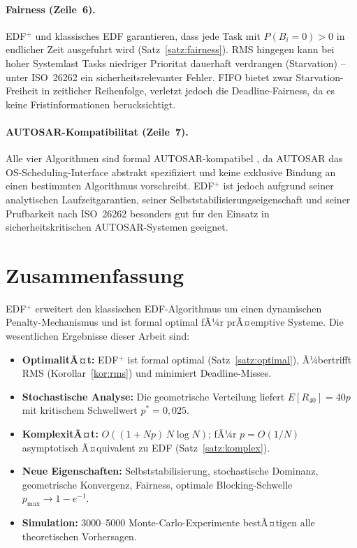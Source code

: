 ﻿\documentclass[a4paper,12pt]{article}
\theoremstyle{definition}
\begin{document}
	\paragraph{Fairness (Zeile~6).}
	EDF$^+$ und klassisches EDF garantieren, dass jede Task mit $P(B_i = 0) > 0$ in
	endlicher Zeit ausgefuhrt wird (Satz~\ref{satz:fairness}). RMS hingegen kann bei
	hoher Systemlast Tasks niedriger Prioritat dauerhaft verdrangen (Starvation) --
	unter ISO~26262 ein sicherheitsrelevanter Fehler. FIFO bietet zwar Starvation-Freiheit
	in zeitlicher Reihenfolge, verletzt jedoch die Deadline-Fairness, da es keine
	Fristinformationen berucksichtigt.

	\paragraph{AUTOSAR-Kompatibilitat (Zeile~7).}
	Alle vier Algorithmen sind formal AUTOSAR-kompatibel \cite{AUTOSAR2023}, da AUTOSAR das
	OS-Scheduling-Interface abstrakt spezifiziert und keine exklusive Bindung an einen
	bestimmten Algorithmus vorschreibt. EDF$^+$ ist jedoch aufgrund seiner analytischen
	Laufzeitgarantien, seiner Selbststabilisierungseigenschaft und seiner Prufbarkeit
	nach ISO~26262 besonders gut fur den Einsatz in sicherheitskritischen
	AUTOSAR-Systemen geeignet.

	\section{Zusammenfassung}
	
	EDF$^+$ erweitert den klassischen EDF-Algorithmus um einen dynamischen
	Penalty-Mecha\-nismus und ist formal optimal fÃ¼r prÃ¤emptive Systeme.
	Die wesentlichen Ergebnisse dieser Arbeit sind:
	
	\begin{itemize}
		\item \textbf{OptimalitÃ¤t:} EDF$^+$ ist formal optimal (Satz~\ref{satz:optimal}),
		Ã¼bertrifft RMS (Korollar~\ref{kor:rms}) und minimiert Deadline-Misses.
		\item \textbf{Stochastische Analyse:} Die geometrische Verteilung liefert
		$E[R_{40}] = 40p$ mit kritischem Schwellwert $p^* = 0{,}025$.
		\item \textbf{KomplexitÃ¤t:} $O((1+Np)\,N\log N)$; fÃ¼r $p = O(1/N)$
		asymptotisch Ã¤quivalent zu EDF (Satz~\ref{satz:komplex}).
		\item \textbf{Neue Eigenschaften:} Selbststabilisierung, stochastische
		Dominanz, geometrische Konvergenz, Fairness, optimale Blocking-Schwelle
		$p_{\max} \to 1-e^{-1}$.
		\item \textbf{Simulation:} 3000--5000 Monte-Carlo-Experimente bestÃ¤tigen
		alle theoretischen Vorhersagen.
	\end{itemize}
	
\end{document}
